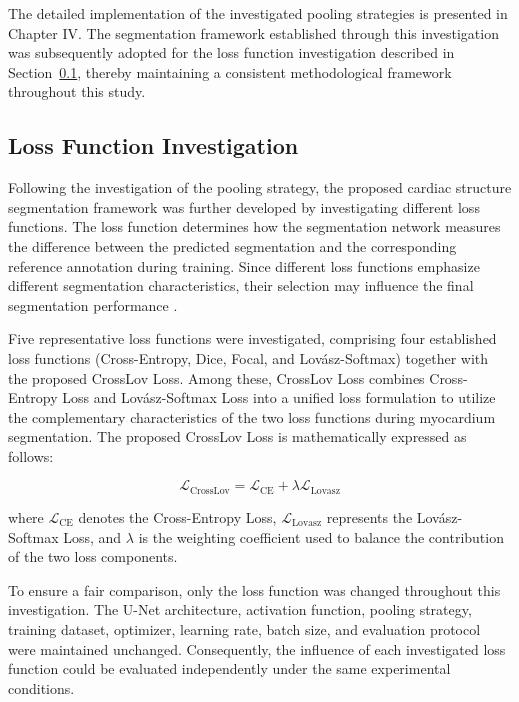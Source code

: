 The detailed implementation of the investigated pooling strategies is presented in Chapter IV. The segmentation framework established through this investigation was subsequently adopted for the loss function investigation described in Section~\ref{subsec:loss-investigation}, thereby maintaining a consistent methodological framework throughout this study.

\subsection{Loss Function Investigation}
\label{subsec:loss-investigation}

Following the investigation of the pooling strategy, the proposed cardiac structure segmentation framework was further developed by investigating different loss functions. The loss function determines how the segmentation network measures the difference between the predicted segmentation and the corresponding reference annotation during training. Since different loss functions emphasize different segmentation characteristics, their selection may influence the final segmentation performance \citep{Ma2021,Azad2023}.

Five representative loss functions were investigated, comprising four established loss functions (Cross-Entropy, Dice, Focal, and Lov\'asz-Softmax) together with the proposed CrossLov Loss. Among these, CrossLov Loss combines Cross-Entropy Loss and Lov\'asz-Softmax Loss into a unified loss formulation to utilize the complementary characteristics of the two loss functions during myocardium segmentation. The proposed CrossLov Loss is mathematically expressed as follows:

\begin{equation}
\mathcal{L}_{\mathrm{CrossLov}}
=
\mathcal{L}_{\mathrm{CE}}
+
\lambda\mathcal{L}_{\mathrm{Lovasz}}
\label{eq:crosslov}
\end{equation}

where $\mathcal{L}_{\mathrm{CE}}$ denotes the Cross-Entropy Loss, $\mathcal{L}_{\mathrm{Lovasz}}$ represents the Lov\'asz-Softmax Loss, and $\lambda$ is the weighting coefficient used to balance the contribution of the two loss components.

To ensure a fair comparison, only the loss function was changed throughout this investigation. The U-Net architecture, activation function, pooling strategy, training dataset, optimizer, learning rate, batch size, and evaluation protocol were maintained unchanged. Consequently, the influence of each investigated loss function could be evaluated independently under the same experimental conditions.

